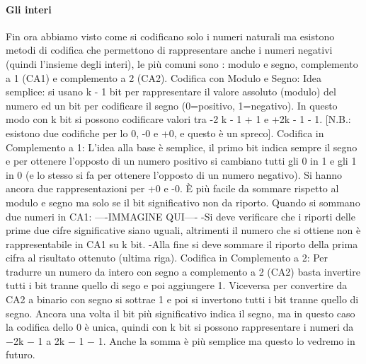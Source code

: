 \paragraph*{Gli interi} Fin ora abbiamo visto come si codificano solo i numeri naturali ma esistono metodi di codifica che permettono di rappresentare anche i numeri negativi (quindi l’insieme degli interi), le più comuni sono : modulo e segno, complemento a 1 (CA1) e complemento a 2 (CA2).
Codifica con Modulo e Segno:
Idea semplice: si usano k - 1 bit per rappresentare il valore assoluto (modulo) del numero  ed un bit per codificare il segno (0=positivo, 1=negativo). In questo modo con k bit si possono codificare valori tra -2 k - 1 + 1 e +2k - 1 - 1. [N.B.: esistono due codifiche per lo 0, -0  e +0, e questo è un spreco].
Codifica in Complemento a 1:
L’idea alla base è semplice, il primo bit indica sempre il segno e per ottenere l’opposto di un numero positivo si cambiano tutti gli 0 in 1 e gli 1 in 0 (e lo stesso si fa per ottenere l’opposto di un numero negativo). Si hanno ancora due rappresentazioni per +0 e -0. È più facile da sommare rispetto al modulo e segno ma solo se il bit significativo non da riporto.
Quando si sommano due numeri in CA1: ----IMMAGINE QUI----
-Si deve verificare che i riporti delle prime due cifre significative siano uguali, altrimenti il numero che si ottiene non è rappresentabile in CA1 su k bit.
-Alla fine si deve sommare il riporto della prima cifra al risultato ottenuto (ultima riga).
Codifica in Complemento a 2:
Per tradurre un numero da intero con segno a complemento a 2 (CA2) basta invertire tutti i bit tranne quello di sego e poi aggiungere 1. Viceversa per convertire da CA2 a binario con segno si sottrae 1 e poi si invertono tutti i bit tranne quello di segno. 
Ancora una volta il bit più significativo indica il segno, ma in questo caso la codifica dello 0 è unica, quindi con k bit si possono rappresentare i numeri da −2k − 1 a 2k − 1 − 1. Anche la somma è più semplice ma questo lo vedremo in futuro.

